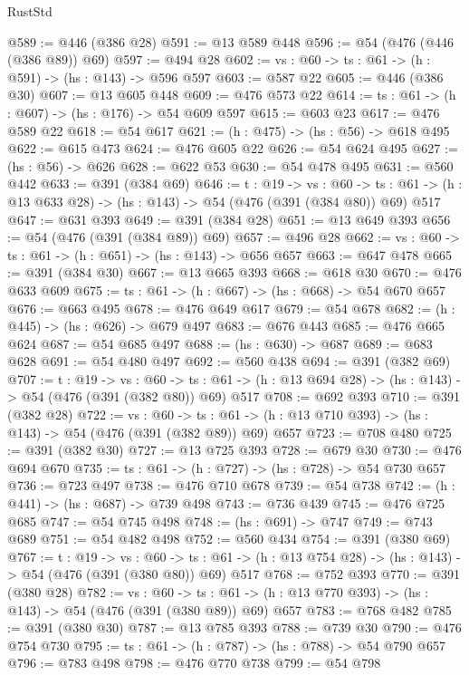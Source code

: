 \begin{lexlean}{RustStd}
\begin{coremodule}
{\begin{coremodule}
{{{{{{{{{{{{{{{{{{{{{{{{{{{{{{{{{{{{{{@589 := @446 (@386 @28)
@591 := @13 @589 @448
@596 := @54 (@476 (@446 (@386 @89)) @69)
@597 := @494 @28
@602 := {vs : @60} -> {ts : @61} -> (h : @591) -> (hs : @143) -> @596 @597
@603 := @587 @22
@605 := @446 (@386 @30)
@607 := @13 @605 @448
@609 := @476 @573 @22
@614 := {ts : @61} -> (h : @607) -> (hs : @176) -> @54 @609 @597
@615 := @603 @23
@617 := @476 @589 @22
@618 := @54 @617
@621 := (h : @475) -> (hs : @56) -> @618 @495
@622 := @615 @473
@624 := @476 @605 @22
@626 := @54 @624 @495
@627 := (hs : @56) -> @626
@628 := @622 @53
@630 := @54 @478 @495
@631 := @560 @442
@633 := @391 (@384 @69)
@646 := {t : @19} ->
  {vs : @60} ->
  {ts : @61} -> (h : @13 @633 @28) -> (hs : @143) -> @54 (@476 (@391 (@384 @80)) @69) @517
@647 := @631 @393
@649 := @391 (@384 @28)
@651 := @13 @649 @393
@656 := @54 (@476 (@391 (@384 @89)) @69)
@657 := @496 @28
@662 := {vs : @60} -> {ts : @61} -> (h : @651) -> (hs : @143) -> @656 @657
@663 := @647 @478
@665 := @391 (@384 @30)
@667 := @13 @665 @393
@668 := @618 @30
@670 := @476 @633 @609
@675 := {ts : @61} -> (h : @667) -> (hs : @668) -> @54 @670 @657
@676 := @663 @495
@678 := @476 @649 @617
@679 := @54 @678
@682 := (h : @445) -> (hs : @626) -> @679 @497
@683 := @676 @443
@685 := @476 @665 @624
@687 := @54 @685 @497
@688 := (hs : @630) -> @687
@689 := @683 @628
@691 := @54 @480 @497
@692 := @560 @438
@694 := @391 (@382 @69)
@707 := {t : @19} ->
  {vs : @60} ->
  {ts : @61} -> (h : @13 @694 @28) -> (hs : @143) -> @54 (@476 (@391 (@382 @80)) @69) @517
@708 := @692 @393
@710 := @391 (@382 @28)
@722 := {vs : @60} ->
  {ts : @61} -> (h : @13 @710 @393) -> (hs : @143) -> @54 (@476 (@391 (@382 @89)) @69) @657
@723 := @708 @480
@725 := @391 (@382 @30)
@727 := @13 @725 @393
@728 := @679 @30
@730 := @476 @694 @670
@735 := {ts : @61} -> (h : @727) -> (hs : @728) -> @54 @730 @657
@736 := @723 @497
@738 := @476 @710 @678
@739 := @54 @738
@742 := (h : @441) -> (hs : @687) -> @739 @498
@743 := @736 @439
@745 := @476 @725 @685
@747 := @54 @745 @498
@748 := (hs : @691) -> @747
@749 := @743 @689
@751 := @54 @482 @498
@752 := @560 @434
@754 := @391 (@380 @69)
@767 := {t : @19} ->
  {vs : @60} ->
  {ts : @61} -> (h : @13 @754 @28) -> (hs : @143) -> @54 (@476 (@391 (@380 @80)) @69) @517
@768 := @752 @393
@770 := @391 (@380 @28)
@782 := {vs : @60} ->
  {ts : @61} -> (h : @13 @770 @393) -> (hs : @143) -> @54 (@476 (@391 (@380 @89)) @69) @657
@783 := @768 @482
@785 := @391 (@380 @30)
@787 := @13 @785 @393
@788 := @739 @30
@790 := @476 @754 @730
@795 := {ts : @61} -> (h : @787) -> (hs : @788) -> @54 @790 @657
@796 := @783 @498
@798 := @476 @770 @738
@799 := @54 @798
}}}}}}}}}}}}}}}}}}}}}}}}}}}}}}}}}}}}}}
\end{coremodule}}
\end{coremodule}
\end{lexlean}
